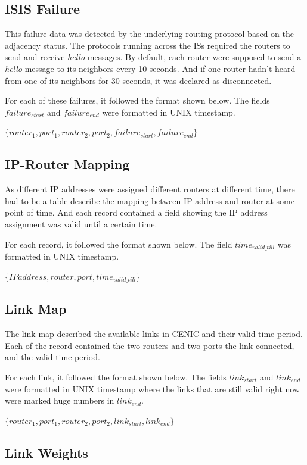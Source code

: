 \documentclass[conference, twocolumn, oneside, 10pt]{IEEEtran}
\begin{document}
\subsection{ISIS Failure}

This failure data was detected by the underlying routing protocol based on the adjacency status. The protocols running across the ISs required the routers to send and receive \textit{hello} messages. By default, each router were supposed to send a \textit{hello} message to its neighbors every 10 seconds. And if one router hadn't heard from one of its neighbors for 30 seconds, it was declared as disconnected.

For each of these failures, it followed the format shown below. The fields $failure_{start}$ and $failure_{end}$ were formatted in UNIX timestamp.

$\{router_1, port_1, router_2, port_2, failure_{start}, failure_{end}\}$

\subsection{IP-Router Mapping}

As different IP addresses were assigned different routers at different time, there had to be a table describe the mapping between IP address and router at some point of time. And each record contained a field showing the IP address assignment was valid until a certain time.

For each record, it followed the format shown below. The field $time_{valid\_till}$ was formatted in UNIX timestamp.

$\{IP address, router, port, time_{valid\_till}\}$

\subsection{Link Map}

The link map described the available links in CENIC and their valid time period. Each of the record contained the two routers and two ports the link connected, and the valid time period.

For each link, it followed the format shown below. The fields $link_{start}$ and $link_{end}$ were formatted in UNIX timestamp where the links that are still valid right now were marked huge numbers in $link_{end}$.

$\{router_1, port_1, router_2, port_2, link_{start}, link_{end}\}$

\subsection{Link Weights}
\end{document}
